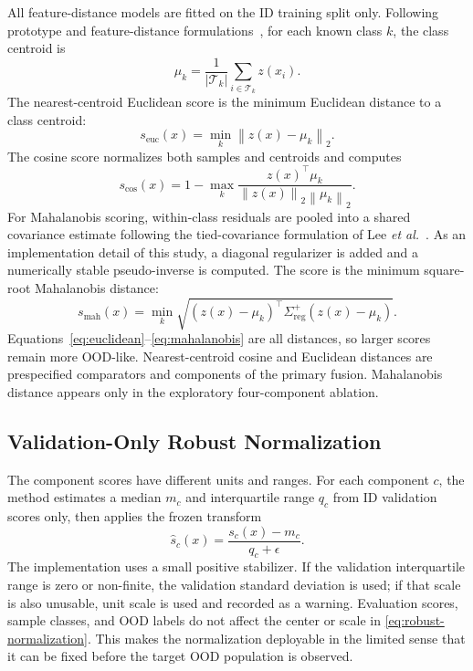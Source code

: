 All feature-distance models are fitted on the ID training split only. Following prototype and feature-distance formulations~\cite{snell2017prototypical,sun2022knn}, for each known class \(k\), the class centroid is
\begin{equation}
  \mu_k = \frac{1}{\lvert\mathcal{T}_k\rvert}
  \sum_{i\in\mathcal{T}_k} z(x_i).
  \label{eq:centroid}
\end{equation}
The nearest-centroid Euclidean score is the minimum Euclidean distance to a class centroid:
\begin{equation}
  s_{\mathrm{euc}}(x) = \min_k \left\lVert z(x)-\mu_k \right\rVert_2.
  \label{eq:euclidean}
\end{equation}
The cosine score normalizes both samples and centroids and computes
\begin{equation}
  s_{\mathrm{cos}}(x)
  = 1-\max_k
  \frac{z(x)^\top\mu_k}
  {\left\lVert z(x)\right\rVert_2\left\lVert\mu_k\right\rVert_2}.
  \label{eq:cosine}
\end{equation}
For Mahalanobis scoring, within-class residuals are pooled into a shared covariance estimate following the tied-covariance formulation of Lee \emph{et al.}~\cite{lee2018mahalanobis}. As an implementation detail of this study, a diagonal regularizer is added and a numerically stable pseudo-inverse is computed. The score is the minimum square-root Mahalanobis distance:
\begin{equation}
  s_{\mathrm{mah}}(x)
  = \min_k \sqrt{
  (z(x)-\mu_k)^\top
  \Sigma_{\mathrm{reg}}^{+}
  (z(x)-\mu_k)}.
  \label{eq:mahalanobis}
\end{equation}
Equations~\eqref{eq:euclidean}--\eqref{eq:mahalanobis} are all distances, so larger scores remain more OOD-like. Nearest-centroid cosine and Euclidean distances are prespecified comparators and components of the primary fusion. Mahalanobis distance appears only in the exploratory four-component ablation.

\subsection{Validation-Only Robust Normalization}

The component scores have different units and ranges. For each component \(c\), the method estimates a median \(m_c\) and interquartile range \(q_c\) from ID validation scores only, then applies the frozen transform
\begin{equation}
  \widehat{s}_c(x)
  = \frac{s_c(x)-m_c}{q_c+\epsilon}.
  \label{eq:robust-normalization}
\end{equation}
The implementation uses a small positive stabilizer. If the validation interquartile range is zero or non-finite, the validation standard deviation is used; if that scale is also unusable, unit scale is used and recorded as a warning. Evaluation scores, sample classes, and OOD labels do not affect the center or scale in \eqref{eq:robust-normalization}. This makes the normalization deployable in the limited sense that it can be fixed before the target OOD population is observed.

